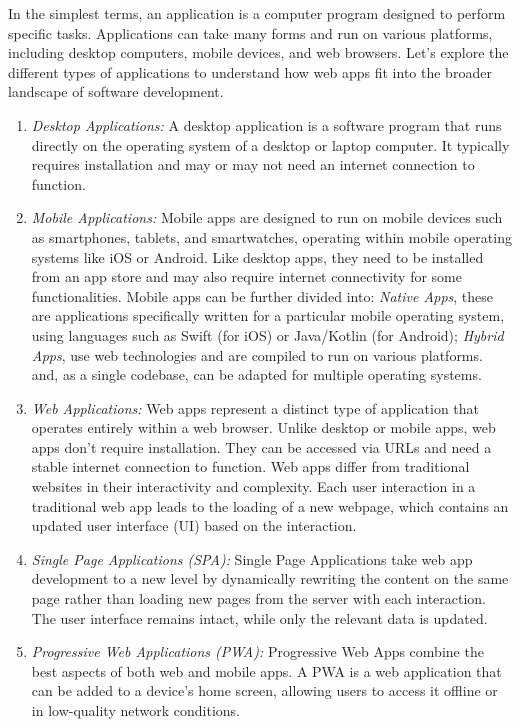 In the simplest terms, an application is a computer program designed to perform specific tasks. Applications can take many forms and run on various platforms, including desktop computers, mobile devices, and web browsers. Let’s explore the different types of applications to understand how web apps fit into the broader landscape of software development.

\begin{enumerate}
    \item \textit{Desktop Applications:} A desktop application is a software program that runs directly on the operating system of a desktop or laptop computer. It typically requires installation and may or may not need an internet connection to function.
    \item \textit{Mobile Applications:} Mobile apps are designed to run on mobile devices such as smartphones, tablets, and smartwatches, operating within mobile operating systems like iOS or Android. Like desktop apps, they need to be installed from an app store and may also require internet connectivity for some functionalities.
    Mobile apps can be further divided into: \textit{Native Apps}, these are applications specifically written for a particular mobile operating system, using languages such as Swift (for iOS) or Java/Kotlin (for Android); \textit{Hybrid Apps}, use web technologies and are compiled to run on various platforms. and, as a single codebase, can be adapted for multiple operating systems.
    \item \textit{Web Applications:} Web apps represent a distinct type of application that operates entirely within a web browser. Unlike desktop or mobile apps, web apps don’t require installation. They can be accessed via URLs and need a stable internet connection to function.
    Web apps differ from traditional websites in their interactivity and complexity. Each user interaction in a traditional web app leads to the loading of a new webpage, which contains an updated user interface (UI) based on the interaction.
    \item \textit{Single Page Applications (SPA):} Single Page Applications take web app development to a new level by dynamically rewriting the content on the same page rather than loading new pages from the server with each interaction. The user interface remains intact, while only the relevant data is updated.
    \item \textit{Progressive Web Applications (PWA):} Progressive Web Apps combine the best aspects of both web and mobile apps. A PWA is a web application that can be added to a device's home screen, allowing users to access it offline or in low-quality network conditions.
\end{enumerate}

